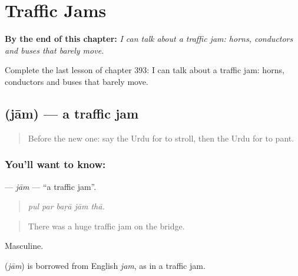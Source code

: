 
\chapter{Traffic Jams}
\label{ch:ur-traffic-jams}

\begin{chapteropening}
\textbf{By the end of this chapter:} \emph{I can talk about a traffic jam: horns, conductors and buses that barely move.}

Complete the last lesson of chapter 393: I can talk about a traffic jam: horns, conductors and buses that barely move.
\end{chapteropening}

\section[\texorpdfstring{\ur{جام} (jām)}{جام (jām)}]{ (jām) — a traffic jam}

\label{lesson:UR-C393-jam}



\begin{quote}
Before the new one: say the Urdu for to stroll, then the Urdu for to pant.
\end{quote}

\subsection*{You'll want to know: }
\textbf{} — \emph{jām} — \textquotedblleft{}a traffic jam\textquotedblright{}.

\begin{quote}
    
\end{quote}

\begin{quote}
\emph{pul par baṛā jām thā.}
\end{quote}

\begin{quote}
There was a huge traffic jam on the bridge.
\end{quote}

Masculine.

\begin{cousinweb}
\textbf{} (\emph{jām}) is borrowed from English \emph{jam}, as in a traffic jam.
\end{cousinweb}

